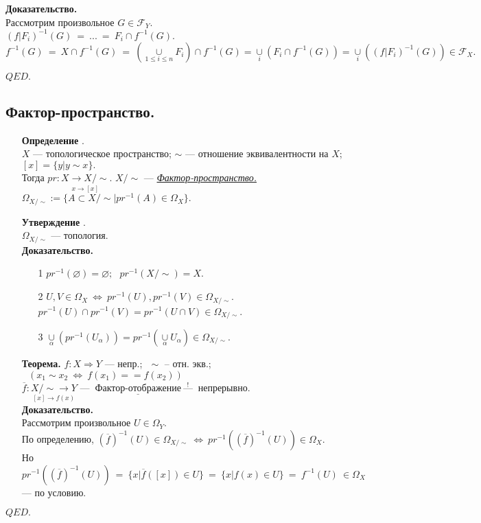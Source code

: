 \documentclass[10pt]{report}
\begin{document}
\begin{spacing}{1.5}
\begin{enumerate}
\textbf{Доказательство.}\\
Рассмотрим произвольное $G\in\mathcal{F}_{Y}.$\\
$(f\vert F_{i})^{-1}(G)~=~...~=~F_{i}\cap f^{-1}(G).$\\
$f^{-1}(G)~=~X\cap f^{-1}(G)~=~(\underset{1\leq i\leq n}{\cup} F_{i})\cap f^{-1}(G) = \underset{i}{\cup}(F_{i}\cap f^{-1}(G)) = \underset{i}{\cup}((f\vert F_{i})^{-1}(G))\in\mathcal{F}_{X}. $
\begin{flushright}
$QED.$
\end{flushright}

\end{enumerate}
\subsection{Фактор-пространство.}
\begin{enumerate}
\item[\textbf{Определение}].\\
$X$ --- топологическое пространство;    $\sim$ --- отношение эквивалентности на $X$; $[x] = \lbrace y\vert y\sim x\rbrace.$\\
Тогда $pr:\underset{x\longrightarrow [x]}{X\rightarrow X/\sim}$. $X/\sim$ --- \underline{\textit{Фактор-пространство.}}
$\Omega_{X/\sim}:=\lbrace A\subset X/\sim\vert pr^{-1}(A)\in\Omega_{X}\rbrace.$
\item[\textbf{Утверждение}].\\
$\Omega_{X/\sim}$ --- топология.\\
\textbf{Доказательство.}
\begin{enumerate}
\item[1] $pr^{-1}(\varnothing) = \varnothing;~~~pr^{-1}(X/\sim)=X.$
\item[2] $U, V\in\Omega_{X}~\Longleftrightarrow~pr^{-1}(U), pr^{-1}(V)\in \Omega_{X/\sim}.$\\
$pr^{-1}(U)\cap pr^{-1}(V) = pr^{-1}(U\cap V)\in \Omega_{X/\sim}$.
\item[3] $\underset{\alpha}{\cup}(pr^{-1}(U_{\alpha}))=pr^{-1}(\underset{\alpha}{\cup}U_{\alpha})\in \Omega_{X/\sim}$.
\end{enumerate}
\item[\textbf{Теорема.}] $f:X\Rightarrow Y$ --- непр.;$~~~\sim$ -- отн. экв.;$~~~(x_{1}\sim x_{2} ~\Leftrightarrow~f(x_{1})==f(x_{2}))$\\
$\overline{f}:\underset{[x]\longrightarrow f(x)}{X/\sim\rightarrow Y}$ --- $~\underline{\textit{Фактор-отображение}}~ \overset{!}{\text{---}}~$ непрерывно.\\
\textbf{Доказательство.}\\
Рассмотрим произвольное $U\in\Omega_{Y}.$\\
По определению, $(\overline{f})^{-1}(U)\in\Omega_{X/\sim}~\Longleftrightarrow~pr^{-1}((\overline{f})^{-1}(U))\in\Omega_{X}.$\\
Но $pr^{-1}((\overline{f})^{-1}(U))~=~\lbrace x\vert \overline{f}([x])\in U\rbrace~=~\lbrace x\vert f(x)\in U\rbrace~=~f^{-1}(U)~\in\Omega_{X}$ --- по условию.
\end{enumerate}
\begin{flushright}
$QED.$
\end{flushright}

\end{spacing}
\end{document}
